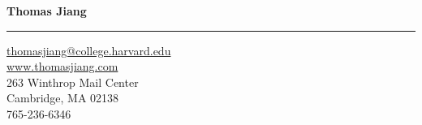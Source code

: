 \documentclass[letterpaper,11pt,oneside]{article}
\begin{document}

\noindent  \LARGE{\textbf{Thomas Jiang}}  \\
\vspace{-2ex} 
\hrule
\normalsize
{}

 \vspace{1ex}
 \noindent 
 \href{mailto:thomasjiang@college.harvard.edu}{thomasjiang@college.harvard.edu} \\
 \href{www.thomasjiang.com}{www.thomasjiang.com}   \\
 263 Winthrop Mail Center \\
 Cambridge, MA 02138 \\
 765-236-6346

\vspace{1em}

\end{document}
